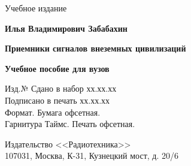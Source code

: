\thispagestyle{empty}

\begin{center}
\textsf{Учебное издание}
\end{center}

\vspace{3cm}

\begin{center}
\textbf{Илья Владимирович Забабахин}

\vspace{10mm}

\textbf{Приемники сигналов внеземных цивилизаций\\}

\vspace{5mm}
\textbf{\small Учебное пособие для вузов}

\vspace{10mm}
Изд.№ Сдано в набор хх.хх.хх  \\
Подписано в печать хх.хх.хх \\
Формат. Бумага офсетная. \\
Гарнитура Таймс. Печать офсетная.


\vspace{10mm}
Издательство <<Радиотехника>>  \\
107031, Москва, К-31, Кузнецкий мост, д. 20/6 \\

\end{center}
